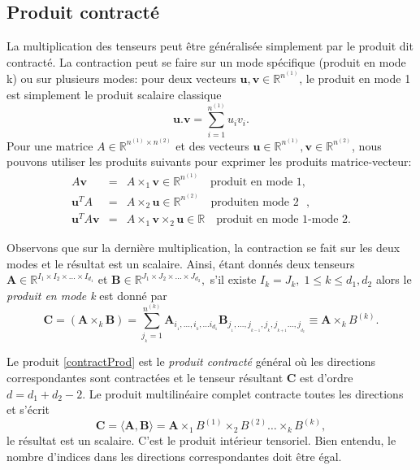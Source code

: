 \documentclass[11pt,a4paper,oneside]{book}
\def\R{\mathbb R}
\begin{document}
\subsection{Produit contracté}
La multiplication des tenseurs peut être généralisée simplement par le produit dit contracté. La contraction peut se faire sur un mode spécifique (produit en mode k) ou sur plusieurs modes: pour deux vecteurs $\mathbf{u}, \mathbf{v} \in \R^{n^{(1)}}$, le produit en mode 1 est simplement le produit scalaire classique
\begin{equation}
\mathbf{u}.\mathbf{v} = \sum_{i=1}^{n^{(1)}}u_iv_i.
\end{equation}
 Pour une matrice $A \in \R^{n^{(1)}\times n^{(2)}}$ et des vecteurs $\mathbf{u} \in \R^{n^{(1)}},\mathbf{v} \in \R^{n^{(2)}}$, nous pouvons utiliser les produits suivants pour exprimer les produits matrice-vecteur:   
$$
\begin{array}{lcl}
A \mathbf{v}& =&A \times_1 \mathbf{v}\in \R^{n^{(1)}}\quad \text{produit en mode $1$},\\
\mathbf{u}^T A&= &A \times_2 \mathbf{u} \in \R^{n^{(2)}}\quad \text{produiten  mode $2$ },\\
\mathbf{u}^T A \mathbf{v}& =& A \times_1\mathbf{v}\times_2 \mathbf{u}\in \R \quad \text{produit en mode $1$-mode $2$}.
\end{array}
$$

Observons que sur la dernière multiplication, la contraction se fait sur les deux modes et le résultat est un scalaire. Ainsi, étant donnés deux tenseurs $\mathbf{A} \in \R^{I_1 \times I_2\times \ldots \times I_{d_1}}$ et $\mathbf{B} \in \R^{J_1 \times J_2\times \ldots \times J_{d_2}},$ s'il existe $I_k= J_k,\; 1 \leq k \leq d_1,d_2$ alors le \textit{produit en mode k} est donné par 
\begin{equation}
\label{contractProd}
\mathbf{C} = (\mathbf{A} \times_k \mathbf{B}) = \sum_{j_{_k}=1}^{n^{(k)}} \mathbf{A}_{i_{_1},\ldots,i_{_k},\ldots i_{d_1}}\mathbf{B}_{j_{_1},\ldots ,j_{_{k-1}},j_{_k},j_{_{k+1}} \ldots,j_{_{d_2}}}\equiv \mathbf{A} \times_k B^{(k)}.
\end{equation}

Le produit \eqref{contractProd} est le \textit{produit contracté} général où les directions correspondantes sont contractées et le tenseur résultant $\mathbf{C} $ est d'ordre $ d = d_{1} + d_{2} - 2 $. Le produit multilinéaire complet contracte toutes les directions et s'écrit
$$\mathbf{C} = \langle{\mathbf{A},\mathbf{B}}\rangle = \mathbf{A} \times_1 B^{(1)}\times_2 B^{(2)}\ldots \times_k B^{(k)},$$ le résultat est un scalaire. C'est le produit intérieur tensoriel. Bien entendu, le nombre d'indices dans les directions correspondantes doit être égal.
\end{document}

